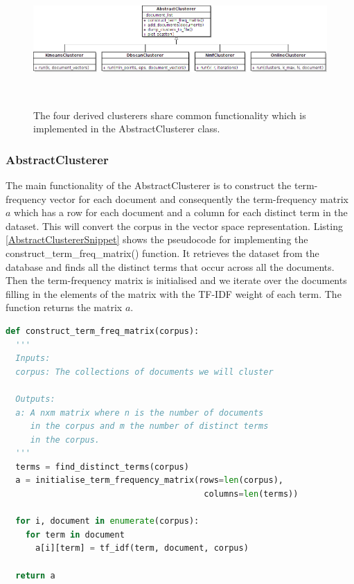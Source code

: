 \begin{figure}[htbp]
  \begin{center}
    \includegraphics[height=2.0in, width=6in]{clusterers-uml}
    \caption{The four derived clusterers share common functionality which is implemented in the AbstractClusterer class. }
    \label{UMLClusterers}
  \end{center}
\end{figure}    

\subsubsection{AbstractClusterer}
\noindent The main functionality of the AbstractClusterer is to construct the term-frequency vector for each document and consequently the term-frequency matrix $a$ which has a row for each document and a column for each distinct term in the dataset. This will convert the corpus in the vector space representation. Listing \ref{AbstractClustererSnippet} shows the pseudocode for implementing the construct\_term\_freq\_matrix() function. It retrieves the dataset from the database and finds all the distinct terms that occur across all the documents. Then the term-frequency matrix is initialised and we iterate over the documents filling in the elements of the matrix with the TF-IDF weight of each term. The function returns the matrix $a$.

\begin{lstlisting}[language=Python, label=AbstractClustererSnippet, caption=Pseudocode for constructing the term-frequency matrix for a dataset]
def construct_term_freq_matrix(corpus):
  '''
  Inputs: 
  corpus: The collections of documents we will cluster
  
  Outputs:
  a: A nxm matrix where n is the number of documents 
     in the corpus and m the number of distinct terms
     in the corpus.  
  '''
  terms = find_distinct_terms(corpus)
  a = initialise_term_frequency_matrix(rows=len(corpus), 
                                        columns=len(terms))
  
  for i, document in enumerate(corpus):
    for term in document
      a[i][term] = tf_idf(term, document, corpus)
    
  return a 
\end{lstlisting}

